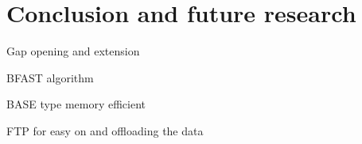 
\chapter{Conclusion and future research}

Gap opening and extension

BFAST algorithm

BASE type memory efficient

FTP for easy on and offloading the data